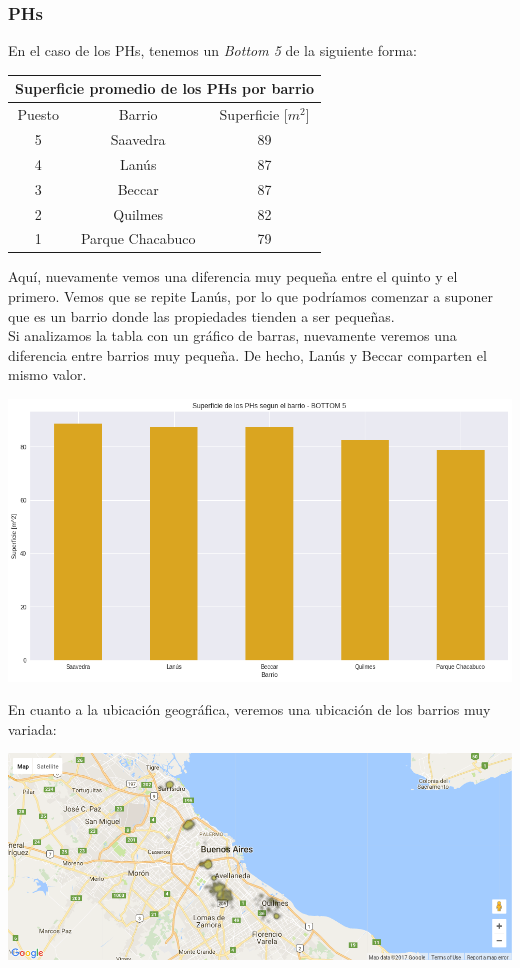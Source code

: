 \documentclass[a4paper, 10pt]{article}
\newcommand\tab[1][0.5cm]{\hspace*{#1}}
\begin{document}
				\subsubsection{PHs}
					En el caso de los PHs, tenemos un \emph{Bottom 5} de la siguiente forma:
					\begin{center}
						\begin{tabular}{ |c|c|c| }
							\hline
							\multicolumn{3}{|c|}{Superficie promedio de los PHs por barrio}\\
							\hline
							\hline
							Puesto & Barrio & Superficie [$m^2$]\\
							\hline
							5 & Saavedra & 89\\
							4 & Lanús & 87\\
							3 & Beccar & 87\\
							2 & Quilmes & 82\\
							1 & Parque Chacabuco & 79\\
							\hline
						\end{tabular}
					\end{center}
					\tab Aquí, nuevamente vemos una diferencia muy pequeña entre el quinto y el primero. Vemos que se repite Lanús,
					por lo que podríamos comenzar a suponer que es un barrio donde las propiedades tienden a ser pequeñas. \\
					\tab Si analizamos la tabla con un gráfico de barras, nuevamente veremos una diferencia entre barrios muy 
					pequeña. De hecho, Lanús y Beccar comparten el mismo valor.
					\begin{center}
   		    				\includegraphics[width=\textwidth]{images/phSurfaceBottomBar}
				  	\end{center}
				  	\tab En cuanto a la ubicación geográfica, veremos una ubicación de los barrios muy variada:
				  	\begin{center}
   		    				\includegraphics[width=\textwidth]{images/phSurfaceBottomMap}
				  	\end{center}
\end{document}
